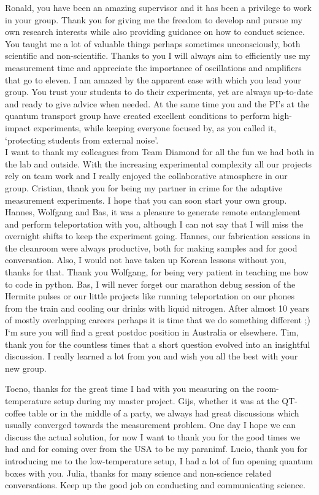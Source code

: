 Ronald, you have been an amazing supervisor and it has been a privilege to work in your group. Thank you for giving me the freedom to develop and pursue my own research interests while also providing guidance on how to conduct science. You taught me a lot of valuable things perhaps sometimes unconsciously, both scientific and non-scientific. Thanks to you I will always aim to efficiently use my measurement time and appreciate the importance of oscillations and amplifiers that go to eleven. I am amazed by the apparent ease with which you lead your group. You trust your students to do their experiments, yet are always up-to-date and ready to give advice when needed. At the same time you and the PI's at the quantum transport group have created excellent conditions to perform high-impact experiments, while keeping everyone focused by, as you called it, `protecting students from external noise'. \\
\newpage
I want to thank my colleagues from Team Diamond for all the fun we had both in the lab and outside. With the increasing experimental complexity all our projects rely on team work and I really enjoyed the collaborative atmosphere in our group. Cristian, thank you for being my partner in crime for the adaptive measurement experiments. I hope that you can soon start your own group. Hannes, Wolfgang and Bas, it was a pleasure to generate remote entanglement and perform teleportation with you, although I can not say that I will miss the overnight shifts to keep the experiment going. Hannes, our fabrication sessions in the cleanroom were always productive, both for making samples and for good conversation. Also, I would not have taken up Korean lessons without you, thanks for that. Thank you Wolfgang, for being very patient in teaching me how to code in python. Bas, I will never forget our marathon debug session of the Hermite pulses or our little projects like running teleportation on our phones from the train and cooling our drinks with liquid nitrogen. After almost 10 years of mostly overlapping careers perhaps it is time that we do something different ;) I`m sure you will find a great postdoc position in Australia or elsewhere. Tim, thank you for the countless times that a short question evolved into an insightful discussion. I really learned a lot from you and wish you all the best with your new group.

Toeno, thanks for the great time I had with you measuring on the room-temperature setup during my master project. Gijs, whether it was at the QT-coffee table or in the middle of a party, we always had great discussions which usually converged towards the measurement problem. One day I hope we can discuss the actual solution, for now I want to thank you for the good times we had and for coming over from the USA to be my paranimf. Lucio, thank you for introducing me to the low-temperature setup, I had a lot of fun opening quantum boxes with you. Julia, thanks for many science and non-science related conversations. Keep up the good job on conducting and communicating science. 

